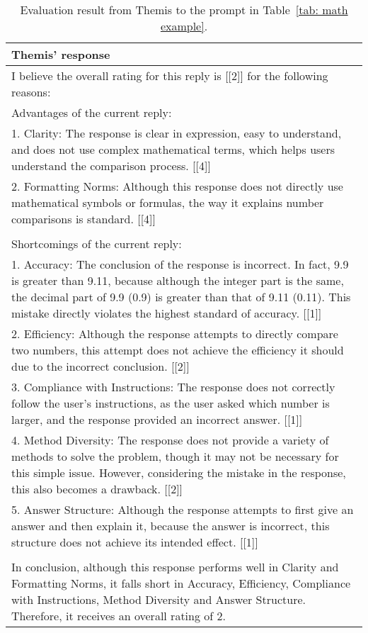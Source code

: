 \begin{table*}[tbh!]
  \caption{Evaluation result from Themis to the prompt in Table~\ref{tab: math example}.}
  \label{tab: themis' response}
  \small
  \begin{tabularx}{\textwidth}{X}
    \toprule
    Themis' response \\ \midrule
    I believe the overall rating for this reply is [[2]] for the following reasons:\\
    Advantages of the current reply:\\
    1. Clarity: The response is clear in expression, easy to understand, and does not use complex mathematical terms, which helps users understand the comparison process. [[4]]\\
    2. Formatting Norms: Although this response does not directly use mathematical symbols or formulas, the way it explains number comparisons is standard. [[4]]\\
    \\
    Shortcomings of the current reply:\\
    1. Accuracy: The conclusion of the response is incorrect. In fact, 9.9 is greater than 9.11, because although the integer part is the same, the decimal part of 9.9 (0.9) is greater than that of 9.11 (0.11). This mistake directly violates the highest standard of accuracy. [[1]]\\
    2. Efficiency: Although the response attempts to directly compare two numbers, this attempt does not achieve the efficiency it should due to the incorrect conclusion. [[2]]\\
    3. Compliance with Instructions: The response does not correctly follow the user's instructions, as the user asked which number is larger, and the response provided an incorrect answer. [[1]]\\
    4. Method Diversity: The response does not provide a variety of methods to solve the problem, though it may not be necessary for this simple issue. However, considering the mistake in the response, this also becomes a drawback. [[2]]\\
    5. Answer Structure: Although the response attempts to first give an answer and then explain it, because the answer is incorrect, this structure does not achieve its intended effect. [[1]]\\
    \\
    In conclusion, although this response performs well in Clarity and Formatting Norms, it falls short in Accuracy, Efficiency, Compliance with Instructions, Method Diversity and Answer Structure. Therefore, it receives an overall rating of 2.\\

\end{tabularx}
\end{table*}
